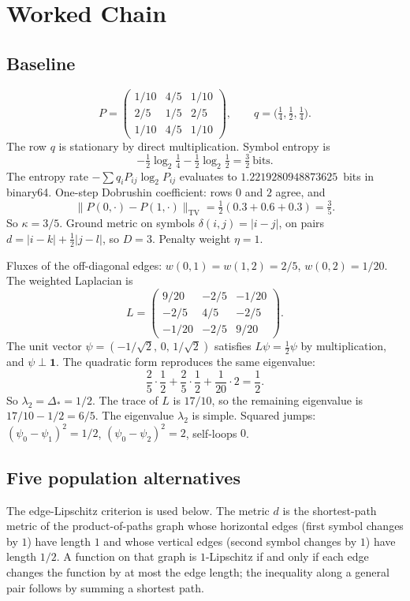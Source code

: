 \documentclass[11pt,reqno]{amsart}
\theoremstyle{remark}
\newcommand{\TV}{\mathrm{TV}}
\begin{document}
\section{Worked Chain}\label{sec:worked}

\subsection{Baseline}

\[
P = \begin{pmatrix} 1/10 & 4/5 & 1/10 \\ 2/5 & 1/5 & 2/5 \\ 1/10 & 4/5 & 1/10 \end{pmatrix},
\qquad
q = \bigl(\tfrac14,\tfrac12,\tfrac14\bigr).
\]
The row $q$ is stationary by direct multiplication. Symbol entropy is
\[
-\tfrac12 \log_2 \tfrac14 - \tfrac12 \log_2 \tfrac12 = \tfrac32 \ \text{bits}.
\]
The entropy rate $-\sum q_i P_{ij} \log_2 P_{ij}$ evaluates to $1.2219280948873625$~bits in binary64. One-step Dobrushin coefficient: rows $0$ and $2$ agree, and
\[
\|P(0,\cdot)-P(1,\cdot)\|_{\TV} = \tfrac12(0.3+0.6+0.3) = \tfrac35.
\]
So $\kappa = 3/5$. Ground metric on symbols $\delta(i,j) = |i-j|$, on pairs $d = |i-k| + \tfrac12 |j-l|$, so $D = 3$. Penalty weight $\eta = 1$.

Fluxes of the off-diagonal edges: $w(0,1) = w(1,2) = 2/5$, $w(0,2) = 1/20$. The weighted Laplacian is
\[
L = \begin{pmatrix}
9/20 & -2/5 & -1/20 \\
-2/5 & 4/5 & -2/5 \\
-1/20 & -2/5 & 9/20
\end{pmatrix}.
\]
The unit vector $\psi = (-1/\sqrt{2},\, 0,\, 1/\sqrt{2})$ satisfies $L\psi = \tfrac12 \psi$ by multiplication, and $\psi \perp \mathbf{1}$. The quadratic form reproduces the same eigenvalue:
\[
\frac25 \cdot \frac12 + \frac25 \cdot \frac12 + \frac{1}{20} \cdot 2 = \frac12.
\]
So $\lambda_2 = \Delta_* = 1/2$. The trace of $L$ is $17/10$, so the remaining eigenvalue is $17/10 - 1/2 = 6/5$. The eigenvalue $\lambda_2$ is simple. Squared jumps: $(\psi_0-\psi_1)^2 = 1/2$, $(\psi_0-\psi_2)^2 = 2$, self-loops $0$.

\subsection{Five population alternatives}

The edge-Lipschitz criterion is used below. The metric $d$ is the shortest-path metric of the product-of-paths graph whose horizontal edges (first symbol changes by $1$) have length $1$ and whose vertical edges (second symbol changes by $1$) have length $1/2$. A function on that graph is $1$-Lipschitz if and only if each edge changes the function by at most the edge length; the inequality along a general pair follows by summing a shortest path.
\end{document}
